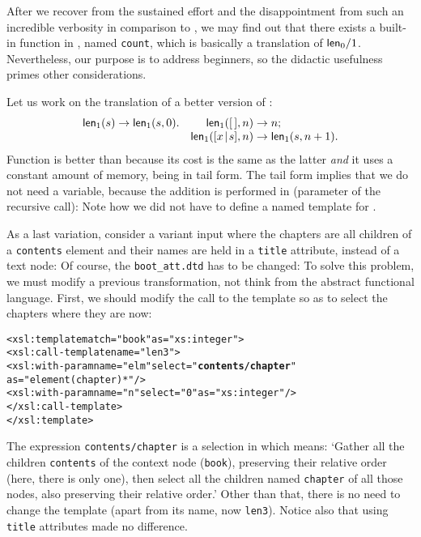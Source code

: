 After we recover from the sustained effort and the disappointment from
such an incredible verbosity in comparison to \Erlang, we may find out
that there exists a built\hyp{}in function in \XPath, named
\texttt{count}, which is basically a translation of
\(\textsf{len}_0/1\). Nevertheless, our purpose is to address beginners,
so the didactic usefulness primes other considerations.

Let us work on the translation of a better version of
:
\begin{equation*}
\begin{array}{@{}r@{\;}l@{\;}lr@{\;}l@{\;}l@{}}
\fun{len}_1(s) & \rightarrow & \fun{len}_1(s,0). &
\fun{len}_1(\el,n) & \rightarrow & n;\\
&&& \fun{len}_1(\cons{x}{s},n) & \rightarrow & \fun{len}_1(s,n+1).
\end{array}
\end{equation*}
Function  is better than  because
its cost is the same as the latter \emph{and} it uses a constant
amount of memory, being in tail form. The tail form implies that we do
not need a variable, because the addition is performed in \XPath
(parameter of the recursive call):
\noindent Note how we did not have to define a named template for
.

As a last variation, consider a variant input where the chapters are
all children of a \texttt{contents} element and their names are held
in a \texttt{title} attribute, instead of a text node:
\noindent Of course, the \DTD \texttt{boot\_att.dtd} has to be
changed: 
\noindent To solve this problem, we must modify a previous \XSLT
transformation, not think from the abstract functional language.
First, we should modify the call to the template so as to select the
chapters where they are now:
\begin{alltt}
  <xsl:template match="book" as="xs:integer">
    <xsl:call-template name="len3">
      <xsl:with-param name="elm" select="\textbf{contents/chapter}"
                                 as="element(chapter)*"/>
      <xsl:with-param name="n" select="0" as="xs:integer"/>
    </xsl:call-template>
  </xsl:template>
\end{alltt}
The expression \texttt{contents/chapter} is a selection in \XPath
which means: `Gather all the children \texttt{contents} of the context
node (\texttt{book}), preserving their relative order (here, there is
only one), then select all the children named \texttt{chapter} of all
those nodes, also preserving their relative order.' Other than that,
there is no need to change the template (apart from its name, now
\texttt{len3}). Notice also that using \texttt{title} attributes made
no difference.

